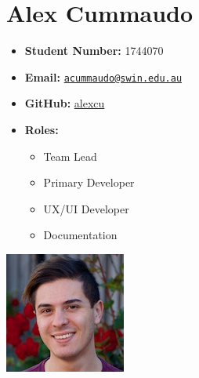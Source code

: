 \documentclass[a4paper]{article}
\date{}
\providecommand{\tightlist}{%
  \setlength{\itemsep}{0pt}\setlength{\parskip}{0pt}}
\begin{document}
{
\setcounter{tocdepth}{3}
\tableofcontents
}
\newpage

\begin{minipage}{0.7\textwidth}
\section{Alex Cummaudo}\label{alex-cummaudo}
\begin{itemize}[label={}]
\tightlist
\item
  \textbf{Student Number:} 1744070
\item
  \textbf{Email:}
  \href{mailto:acummaudo@swin.edu.au}{\nolinkurl{acummaudo@swin.edu.au}}
\item
  \textbf{GitHub:} \href{http://www.github.com/alexcu}{alexcu}
\item
  \textbf{Roles:}
  \begin{itemize}
    \item Team Lead
    \item Primary Developer
    \item UX/UI Developer
    \item Documentation
  \end{itemize}
\end{itemize}
\end{minipage}%
\begin{minipage}{0.3\textwidth}
\includegraphics{./imgs/alex.jpeg}
\end{minipage}

\vspace{3em}
\end{document}
